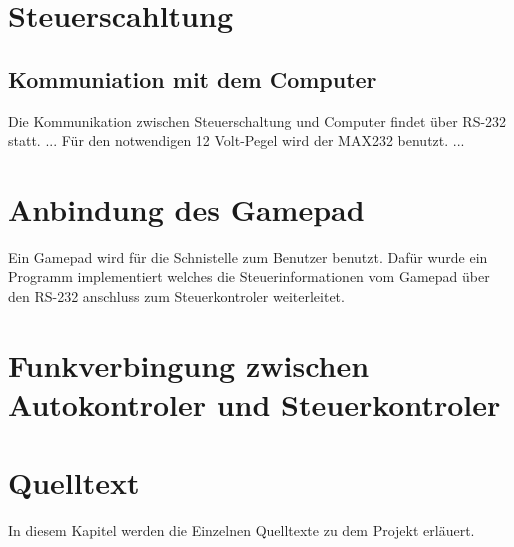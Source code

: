 \documentclass{scrartcl}
\begin{document}
\section{Steuerscahltung}

	\subsection{Kommuniation mit dem Computer} %
		Die Kommunikation zwischen Steuerschaltung und Computer findet über RS-232 statt.
		...
		Für den notwendigen 12 Volt-Pegel wird der MAX232 benutzt.
		...	

	\section{Anbindung des Gamepad} %
		Ein Gamepad wird für die Schnistelle zum Benutzer benutzt.
		Dafür wurde ein Programm implementiert welches die Steuerinformationen vom Gamepad
		über den RS-232 anschluss zum Steuerkontroler weiterleitet.

\section{Funkverbingung zwischen Autokontroler und Steuerkontroler} %

\section{Quelltext} %
	In diesem Kapitel werden die Einzelnen Quelltexte zu dem Projekt erläuert.
\end{document}
